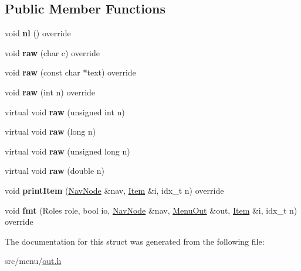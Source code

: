 \subsection*{Public Member Functions}
\begin{DoxyCompactItemize}
\item 
\mbox{\label{structMenuOutDef_a3bdf78cf3e8d7d1cfa5ac7259ca7621e}} 
void {\bfseries nl} () override
\item 
\mbox{\label{structMenuOutDef_a39e40e2057b5826cfb7e7335e34a8ab7}} 
void {\bfseries raw} (char c) override
\item 
\mbox{\label{structMenuOutDef_aa152cf800b2e15afc5ce302578b25e50}} 
void {\bfseries raw} (const char $\ast$text) override
\item 
\mbox{\label{structMenuOutDef_a036d30bc8f65edfd150439f3ecb39494}} 
void {\bfseries raw} (int n) override
\item 
\mbox{\label{structMenuOutDef_a355e01d35898291f9a7d148d0cb11ebe}} 
virtual void {\bfseries raw} (unsigned int n)
\item 
\mbox{\label{structMenuOutDef_a5644e6d14fe15067e13dd6b10f487ef5}} 
virtual void {\bfseries raw} (long n)
\item 
\mbox{\label{structMenuOutDef_a71e9e58284f61f9589e1edf58d1b93d3}} 
virtual void {\bfseries raw} (unsigned long n)
\item 
\mbox{\label{structMenuOutDef_af9d69f782087792e4cc97657a58a1b75}} 
virtual void {\bfseries raw} (double n)
\item 
\mbox{\label{structMenuOutDef_a9f373df24ad0f16625dd1ba97b422491}} 
void {\bfseries print\+Item} (\hyperlink{structNavNode}{Nav\+Node} \&nav, \hyperlink{structItem}{Item} \&i, idx\+\_\+t n) override
\item 
\mbox{\label{structMenuOutDef_afea6ae776b595da4c6b0f17b19807a94}} 
void {\bfseries fmt} (Roles role, bool io, \hyperlink{structNavNode}{Nav\+Node} \&nav, \hyperlink{structMenuOut}{Menu\+Out} \&out, \hyperlink{structItem}{Item} \&i, idx\+\_\+t n) override
\end{DoxyCompactItemize}


The documentation for this struct was generated from the following file\+:\begin{DoxyCompactItemize}
\item 
src/menu/\hyperlink{out_8h}{out.\+h}\end{DoxyCompactItemize}

